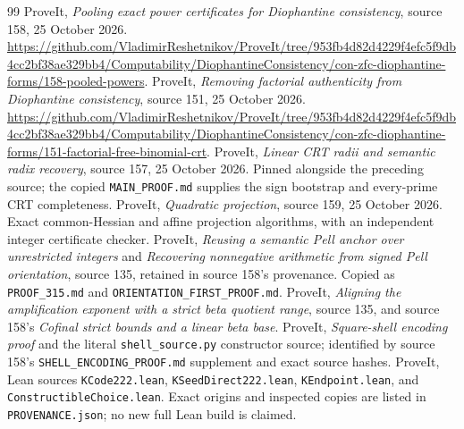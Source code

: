 \documentclass[11pt]{article}
\theoremstyle{definition}\newtheorem{remark}[theorem]{Remark}
\begin{document}
\begin{thebibliography}{99}
 ProveIt, \emph{Pooling exact power certificates for
Diophantine consistency}, source 158, 25 October 2026.
\url{https://github.com/VladimirReshetnikov/ProveIt/tree/953fb4d82d4229f4efc5f9db4cc2bf38ae329bb4/Computability/DiophantineConsistency/con-zfc-diophantine-forms/158-pooled-powers}.
 ProveIt, \emph{Removing factorial authenticity from
Diophantine consistency}, source 151, 25 October 2026.
\url{https://github.com/VladimirReshetnikov/ProveIt/tree/953fb4d82d4229f4efc5f9db4cc2bf38ae329bb4/Computability/DiophantineConsistency/con-zfc-diophantine-forms/151-factorial-free-binomial-crt}.
 ProveIt, \emph{Linear CRT radii and semantic radix
recovery}, source 157, 25 October 2026. Pinned alongside the preceding source;
the copied \nolinkurl{MAIN_PROOF.md} supplies the sign bootstrap and
every-prime CRT completeness.
 ProveIt, \emph{Quadratic projection}, source 159,
25 October 2026. Exact common-Hessian and affine projection algorithms,
with an independent integer certificate checker.
 ProveIt, \emph{Reusing a semantic Pell anchor over
unrestricted integers} and \emph{Recovering nonnegative arithmetic from
signed Pell orientation}, source 135, retained in source 158's provenance.
Copied as \nolinkurl{PROOF_315.md} and \nolinkurl{ORIENTATION_FIRST_PROOF.md}.
 ProveIt, \emph{Aligning the amplification exponent
with a strict beta quotient range}, source 135, and source 158's
\emph{Cofinal strict bounds and a linear beta base}.
 ProveIt, \emph{Square-shell encoding proof} and the literal
\nolinkurl{shell_source.py} constructor source; identified by source 158's
\nolinkurl{SHELL_ENCODING_PROOF.md} supplement and exact source hashes.
 ProveIt, Lean sources \nolinkurl{KCode222.lean},
\nolinkurl{KSeedDirect222.lean}, \nolinkurl{KEndpoint.lean}, and
\nolinkurl{ConstructibleChoice.lean}. Exact origins and inspected copies are
listed in \nolinkurl{PROVENANCE.json}; no new full Lean build is claimed.
\end{thebibliography}
\end{document}
